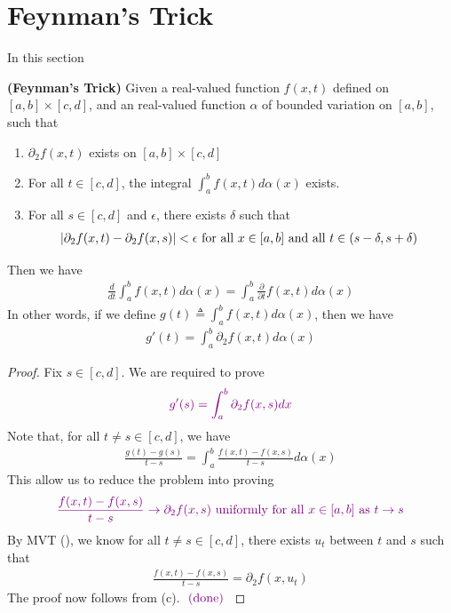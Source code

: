 \documentclass{report}
\begin{document}
\section{Feynman's Trick}
\begin{mdframed}
In this section
\end{mdframed}
\begin{theorem}
\textbf{(Feynman's Trick)} Given a real-valued function $f (x,t)$ defined on $[a,b]\times [c,d]$, and an real-valued function $\alpha $ of bounded variation on $[a,b]$, such that 
\begin{enumerate}[label=(\alph*)]
  \item $\partial_2f(x,t)$ exists on $[a,b]\times [c,d]$
  \item For all $t\in [c,d]$, the integral $\int_a^b f (x,t)d \alpha (x)$ exists. 
  \item For all $s \in [c,d]$ and $\epsilon $, there exists $\delta$ such that 
    \begin{align*}
    \left|\partial_2f (x,t)- \partial_2f(x,s)\right| <\epsilon \text{ for all $x\in [a,b]$ and all $t \in (s-\delta, s+\delta)$ }
    \end{align*}

\end{enumerate}
Then we have 
\begin{align*}
\frac{d}{dt}\int_a^b f(x,t)d\alpha (x)= \int_a^b \frac{\partial }{\partial t}f(x,t)d\alpha (x)
\end{align*}
In other words, if we define $g(t)\triangleq \int_a^b f(x,t)d\alpha (x)$, then we have
\begin{align*}
g'(t)=\int_a^b \partial_2 f(x,t)d\alpha (x)
\end{align*}
\end{theorem}
\begin{proof}
Fix $s \in [c,d]$. We are required to prove 
\begin{align*}
\textcolor{violet}{g'(s)=\int_a^b \partial_2 f(x,s)dx}
\end{align*}
Note that, for all $t \neq s \in [c,d]$, we have
\begin{align*}
  \frac{g(t)-g(s)}{t-s}=\int_a^b \frac{f(x,t)-f(x,s)}{t-s}d\alpha (x)
\end{align*}
This allow us to reduce the problem into proving 
\begin{align*}
  \textcolor{violet}{\frac{f(x,t)-f(x,s)}{t-s}\to \partial_2 f(x,s)\text{ uniformly for all $x \in [a,b]$ as }t\to s}
\end{align*}
By MVT (), we know for all $t\neq s \in [c,d]$, there exists  $u_t$ between $t$ and $s$ such that 
\begin{align*}
\frac{f(x,t)-f(x,s)}{t-s}= \partial_2 f(x,u_t)
\end{align*}
The proof now follows from (c). $\textcolor{violet}{\text{ (done) }}$
\end{proof}
\end{document}
